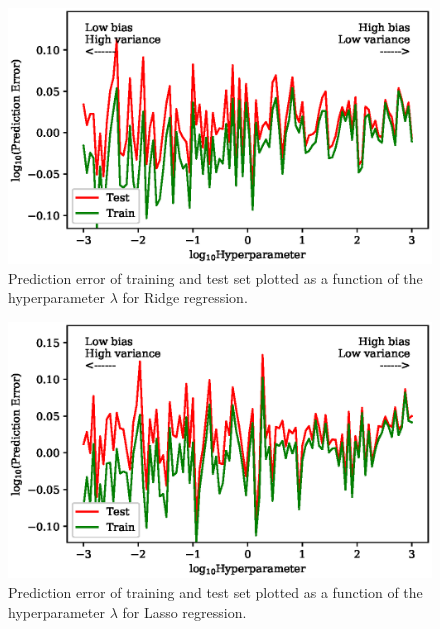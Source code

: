 \documentclass[a4paper, 10pt]{article}
\begin{document}
\begin{figure}[H]
    \includegraphics{figs/biasvariancetradeoff_Ridge_Franke.eps}
    \caption{Prediction error of training and test set plotted as a function of the hyperparameter $\lambda$ for Ridge regression.}
\end{figure}    

\begin{figure}[H]
    \includegraphics{figs/biasvariancetradeoff_LASSO_Franke.eps}
    \caption{Prediction error of training and test set plotted as a function of the hyperparameter $\lambda$ for Lasso regression.}
\end{figure} 
\end{document}
